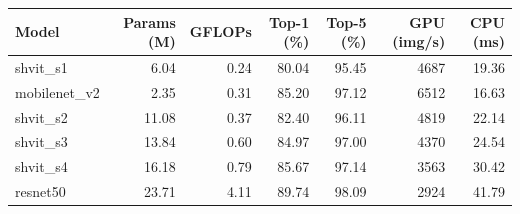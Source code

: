 \begin{tabular}{lrrrrrr}
\hline
Model & Params (M) & GFLOPs & Top-1 (\%) & Top-5 (\%) & GPU (img/s) & CPU (ms) \\
\hline
shvit\_s1 & 6.04 & 0.24 & 80.04 & 95.45 & 4687 & 19.36 \\
mobilenet\_v2 & 2.35 & 0.31 & 85.20 & 97.12 & 6512 & 16.63 \\
shvit\_s2 & 11.08 & 0.37 & 82.40 & 96.11 & 4819 & 22.14 \\
shvit\_s3 & 13.84 & 0.60 & 84.97 & 97.00 & 4370 & 24.54 \\
shvit\_s4 & 16.18 & 0.79 & 85.67 & 97.14 & 3563 & 30.42 \\
resnet50 & 23.71 & 4.11 & 89.74 & 98.09 & 2924 & 41.79 \\
\hline
\end{tabular}
